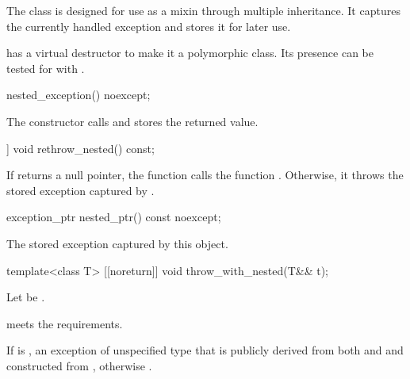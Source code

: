 \pnum
The class  is designed for use as a mixin through
multiple inheritance. It captures the currently handled exception and stores it
for later use.

\pnum
\begin{note}
 has a virtual destructor to make it a
polymorphic class. Its presence can be tested for with .
\end{note}

%
\begin{itemdecl}
nested_exception() noexcept;
\end{itemdecl}

\begin{itemdescr}
\pnum
\effects
The constructor calls  and stores the returned value.
\end{itemdescr}

%
\begin{itemdecl}
[[noreturn]] void rethrow_nested() const;
\end{itemdecl}

\begin{itemdescr}
\pnum
\effects
If  returns a null pointer, the function calls the function .
Otherwise, it throws the stored exception captured by .
\end{itemdescr}

%
\begin{itemdecl}
exception_ptr nested_ptr() const noexcept;
\end{itemdecl}

\begin{itemdescr}
\pnum
\returns
The stored exception captured by this  object.
\end{itemdescr}

%
\begin{itemdecl}
template<class T> [[noreturn]] void throw_with_nested(T&& t);
\end{itemdecl}

\begin{itemdescr}
\pnum
Let  be .

\pnum
\expects
{} meets the  requirements.

\pnum
\throws
If 
is ,
an exception of unspecified type that is publicly derived from both
 and 
and constructed from , otherwise
.
\end{itemdescr}

